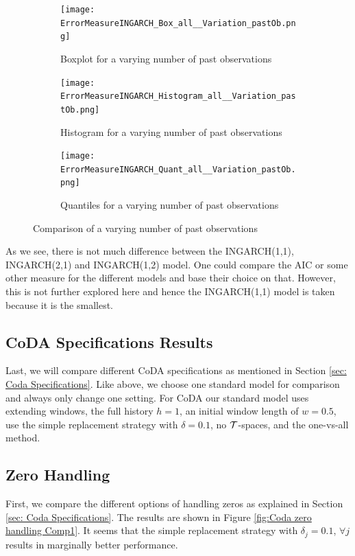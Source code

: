 \begin{figure}[htb!]
\centering
\begin{subfigure}[b]{0.45\textwidth}
\texttt{[image: ErrorMeasureINGARCH\_Box\_all\_\_Variation\_pastOb.png]}
\caption{Boxplot for a varying number of past observations}
\label{fig:past obs Box}
\end{subfigure}
\hfill
\begin{subfigure}[b]{0.45\textwidth}
\texttt{[image: ErrorMeasureINGARCH\_Histogram\_all\_\_Variation\_pastOb.png]}
\caption{Histogram for a varying number of past observations}
\label{fig:past obs Hist}
\end{subfigure}
\hfill
\begin{subfigure}[b]{0.8\textwidth}
\texttt{[image: ErrorMeasureINGARCH\_Quant\_all\_\_Variation\_pastOb.png]}
\caption{Quantiles for a varying number of past observations}
\label{fig:past obs Quant}
\end{subfigure}
\caption{Comparison of a varying number of past observations}
\label{fig:past obs Comp1}
\end{figure}

As we see, there is not much difference between the INGARCH(1,1), INGARCH(2,1) and INGARCH(1,2) model. One could compare the AIC or some other measure for the different models and base their choice on that. However, this is not further explored here and hence the INGARCH(1,1) model is taken because it is the smallest.

\subsection{CoDA Specifications Results}
\label{sec: CoDA Specifications Results}

Last, we will compare different CoDA specifications as mentioned in Section \ref{sec: Coda Specifications}. Like above, we choose one standard model for comparison and always only change one setting. For CoDA our standard model uses extending windows, the full history $h=1$, an initial window length of $w=0.5$, use the simple replacement strategy with $\delta=0.1$, no $\mathcal{T}$-spaces, and the one-vs-all method. 

\subsection{Zero Handling}
\label{sec: Zero Handling}

First, we compare the different options of handling zeros as explained in Section \ref{sec: Coda Specifications}. The results are shown in Figure \ref{fig:Coda zero handling Comp1}. It seems that the simple replacement strategy with $\delta_j = 0.1$, $\forall j$ results in marginally better performance.

